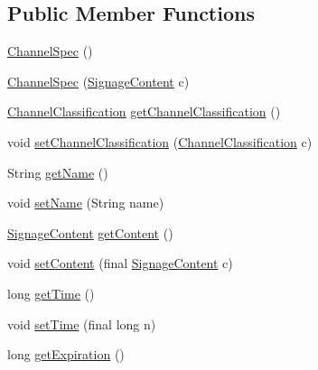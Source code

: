 \subsection*{Public Member Functions}
\begin{DoxyCompactItemize}
\item 
\hyperlink{classgov_1_1fnal_1_1ppd_1_1dd_1_1xml_1_1ChannelSpec_ae5b8e58a261d369402c2ece54389a97b}{Channel\-Spec} ()
\item 
\hyperlink{classgov_1_1fnal_1_1ppd_1_1dd_1_1xml_1_1ChannelSpec_a17141ffdb2fbd67bfd1a4b1edd83b7dc}{Channel\-Spec} (\hyperlink{interfacegov_1_1fnal_1_1ppd_1_1dd_1_1signage_1_1SignageContent}{Signage\-Content} c)
\item 
\hyperlink{classgov_1_1fnal_1_1ppd_1_1dd_1_1changer_1_1ChannelClassification}{Channel\-Classification} \hyperlink{classgov_1_1fnal_1_1ppd_1_1dd_1_1xml_1_1ChannelSpec_a24166b1e786b9e7ca56349721e161661}{get\-Channel\-Classification} ()
\item 
void \hyperlink{classgov_1_1fnal_1_1ppd_1_1dd_1_1xml_1_1ChannelSpec_aef1831e2c9ce866b7385d3ce26d7c7a6}{set\-Channel\-Classification} (\hyperlink{classgov_1_1fnal_1_1ppd_1_1dd_1_1changer_1_1ChannelClassification}{Channel\-Classification} c)
\item 
String \hyperlink{classgov_1_1fnal_1_1ppd_1_1dd_1_1xml_1_1ChannelSpec_a6aac0c216c658ef18bc54d5d8b61d4d4}{get\-Name} ()
\item 
void \hyperlink{classgov_1_1fnal_1_1ppd_1_1dd_1_1xml_1_1ChannelSpec_a7b261516ee8d2de69bbebd5edb0d4f54}{set\-Name} (String name)
\item 
\hyperlink{interfacegov_1_1fnal_1_1ppd_1_1dd_1_1signage_1_1SignageContent}{Signage\-Content} \hyperlink{classgov_1_1fnal_1_1ppd_1_1dd_1_1xml_1_1ChannelSpec_abe2d2d6c4dcb5adf92b7e3feaf4a3441}{get\-Content} ()
\item 
void \hyperlink{classgov_1_1fnal_1_1ppd_1_1dd_1_1xml_1_1ChannelSpec_afa864ed5c883d94bcc86678c7cb8c3eb}{set\-Content} (final \hyperlink{interfacegov_1_1fnal_1_1ppd_1_1dd_1_1signage_1_1SignageContent}{Signage\-Content} c)
\item 
long \hyperlink{classgov_1_1fnal_1_1ppd_1_1dd_1_1xml_1_1ChannelSpec_a98b9534e6dd2561a140735af84281d67}{get\-Time} ()
\item 
void \hyperlink{classgov_1_1fnal_1_1ppd_1_1dd_1_1xml_1_1ChannelSpec_a5ea9412ca266ecdb2b4766abfeb0fd60}{set\-Time} (final long n)
\item 
long \hyperlink{classgov_1_1fnal_1_1ppd_1_1dd_1_1xml_1_1ChannelSpec_a4c20313da2c3573d12684dd21b12ad39}{get\-Expiration} ()

\end{DoxyCompactItemize}
